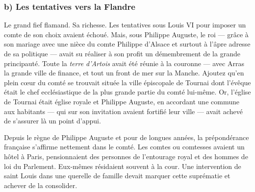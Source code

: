 \documentclass[french,twoside]{book} %
\begin{document}
\subsubsection[{b) Les tentatives vers la Flandre}]{b) Les tentatives vers la Flandre}
\noindent Le grand fief flamand. Sa richesse. Les tentatives sous Louis VI pour imposer un comte de son choix avaient échoué. Mais, sous Philippe Auguste, le roi — grâce à son mariage avec une nièce du comte Philippe d’Alsace et surtout à l’âpre adresse de sa politique — avait su réaliser à son profit un démembrement de la grande principauté. Toute la \emph{terre d’Artois} avait été réunie à la couronne — avec Arras la grande ville de finance, et tout un front de mer sur la Manche. Ajoutez qu’en plein cœur du comté se trouvait située la ville épiscopale de Tournai dont l’évêque était le chef ecclésiastique de la plus grande partie du comté lui-même. Or, l’église de Tournai était église royale et Philippe Auguste, en accordant une commune aux habitants — qui sur son invitation avaient fortifié leur ville — avait achevé de s’assurer là un point d’appui.\par
Depuis le règne de Philippe Auguste et pour de longues années, la prépondérance française s’affirme nettement dans le comté. Les comtes ou comtesses avaient un hôtel à Paris, pensionnaient des personnes de l’entourage royal et des hommes de loi du Parlement. Eux-mêmes résidaient souvent à la cour. Une intervention de saint Louis dans une querelle de famille devait marquer cette suprématie et achever de la consolider.\par
\end{document}
